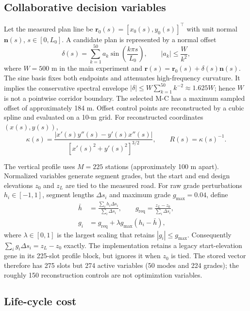 \documentclass[preprint,12pt]{elsarticle}
\begin{document}
\subsection{Collaborative decision variables}

Let the measured plan line be $\bm r_0(s)=[x_0(s),y_0(s)]^\top$ with unit normal $\bm n(s)$, $s\in[0,L_0]$. A candidate plan is represented by a normal offset
\begin{equation}
\delta(s)=\sum_{k=1}^{50}a_k\sin\left(\frac{k\pi s}{L_0}\right), \qquad
|a_k|\leq \frac{W}{k^2},
\label{eq:sine}
\end{equation}
where $W=500$ m in the main experiment and $\bm r(s)=\bm r_0(s)+\delta(s)\bm n(s)$. The sine basis fixes both endpoints and attenuates high-frequency curvature. It implies the conservative spectral envelope $|\delta|\leq W\sum_{k=1}^{50}k^{-2}\approx1.625W$; hence $W$ is not a pointwise corridor boundary. The selected M-C has a maximum sampled offset of approximately 184 m. Offset control points are reconstructed by a cubic spline and evaluated on a 10-m grid. For reconstructed coordinates $(x(s),y(s))$,
\begin{equation}
\kappa(s)=\frac{|x'(s)y''(s)-y'(s)x''(s)|}
{[x'(s)^2+y'(s)^2]^{3/2}},\qquad R(s)=\kappa(s)^{-1}.
\label{eq:curvature}
\end{equation}

The vertical profile uses $M=225$ stations (approximately 100 m apart). Normalized variables generate segment grades, but the start and end design elevations $z_0$ and $z_L$ are tied to the measured road. For raw grade perturbations $h_i\in[-1,1]$, segment lengths $\Delta s_i$ and maximum grade $g_{\max}=0.04$, define
\begin{align}
\bar h&=\frac{\sum_i h_i\Delta s_i}{\sum_i\Delta s_i},\qquad
g_{\mathrm{req}}=\frac{z_L-z_0}{\sum_i\Delta s_i},\\
g_i&=g_{\mathrm{req}}+\lambda g_{\max}(h_i-\bar h),
\label{eq:grades}
\end{align}
where $\lambda\in[0,1]$ is the largest scaling that retains $|g_i|\leq g_{\max}$. Consequently $\sum_i g_i\Delta s_i=z_L-z_0$ exactly. The implementation retains a legacy start-elevation gene in its 225-slot profile block, but ignores it when $z_0$ is tied. The stored vector therefore has 275 slots but 274 active variables (50 modes and 224 grades); the roughly 150 reconstruction controls are not optimization variables.

\subsection{Life-cycle cost}
\end{document}
